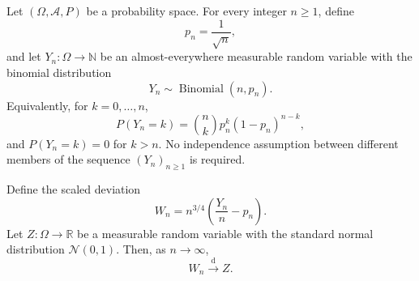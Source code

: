 \begin{theorem}
Let $(\Omega,\mathcal A,P)$ be a probability space.  For every integer
$n\ge 1$, define
\[
  p_n=\frac{1}{\sqrt n},
\]
and let $Y_n:\Omega\to\mathbb N$ be an almost-everywhere measurable
random variable with the binomial distribution
\[
  Y_n\sim\operatorname{Binomial}(n,p_n).
\]
Equivalently, for $k=0,\ldots,n$,
\[
  P(Y_n=k)=\binom nk p_n^k(1-p_n)^{n-k},
\]
and $P(Y_n=k)=0$ for $k>n$.  No independence assumption between
different members of the sequence $(Y_n)_{n\ge 1}$ is required.

Define the scaled deviation
\[
  W_n=n^{3/4}\left(\frac{Y_n}{n}-p_n\right).
\]
Let $Z:\Omega\to\mathbb R$ be a measurable random variable with the
standard normal distribution $\mathcal N(0,1)$.  Then, as $n\to\infty$,
\[
  W_n\xrightarrow{\mathrm d}Z.
\]
\end{theorem}
